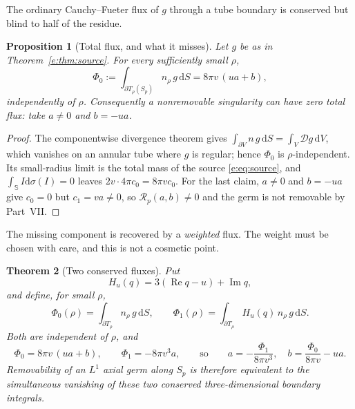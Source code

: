\documentclass[11pt,a4paper]{article}
\numberwithin{equation}{section}
\newtheorem{theorem}{Theorem}[section]
\newtheorem{proposition}[theorem]{Proposition}
\theoremstyle{definition}
\theoremstyle{remark}
\theoremstyle{plain}
\newcommand{\SSS}{\mathbb S}
\DeclareMathOperator{\Rea}{Re}
\DeclareMathOperator{\Ima}{Im}
\newcommand{\Dop}{\mathcal D}
\newcommand{\Sp}{S_{p}}
\newcommand{\Rp}{\mathcal R_{p}}      %
\newcommand{\Tube}{T}
\newcommand{\dd}{\mathrm d}
\begin{document}
The ordinary Cauchy--Fueter flux of $g$ through a tube boundary is
conserved but blind to half of the residue.

\begin{proposition}[Total flux, and what it misses]
\label{e:prop:flux0}
Let $g$ be as in Theorem~\ref{e:thm:source}. For every sufficiently small
$\rho$,
\begin{equation}
 \Phi_0:=\int_{\partial\Tube_\rho(\Sp)}n_\rho\,g\,\dd S
       =8\pi v\,(ua+b),
 \label{e:eq:flux0}
\end{equation}
independently of $\rho$. Consequently a nonremovable singularity can have
zero total flux: take $a\ne0$ and $b=-ua$.
\end{proposition}

\begin{proof}
The componentwise divergence theorem gives
$\int_{\partial V}n\,g\,\dd S=\int_V\Dop g\,\dd V$, which vanishes on an
annular tube where $g$ is regular; hence $\Phi_0$ is
$\rho$-independent. Its small-radius limit is the total mass of the
source \eqref{e:eq:source}, and $\int_{\SSS}I\dd\sigma(I)=0$ leaves
$2v\cdot4\pi c_0=8\pi vc_0$. For the last claim, $a\ne0$ and $b=-ua$ give
$c_0=0$ but $c_1=va\ne0$, so $\Rp(a,b)\ne0$ and the germ is not
removable by Part~VII.
\end{proof}

The missing component is recovered by a \emph{weighted} flux. The weight
must be chosen with care, and this is not a cosmetic point.

\begin{theorem}[Two conserved fluxes]
\label{e:thm:twoflux}
Put
\begin{equation}
 H_u(q)=3(\Rea q-u)+\Ima q,
 \label{e:eq:Hu}
\end{equation}
and define, for small $\rho$,
\begin{equation}
 \Phi_0(\rho)=\int_{\partial\Tube_\rho}n_\rho\,g\,\dd S,
 \qquad
 \Phi_1(\rho)=\int_{\partial\Tube_\rho}H_u(q)\,n_\rho\,g\,\dd S.
 \label{e:eq:twoflux}
\end{equation}
Both are independent of $\rho$, and
\begin{equation}
 \Phi_0=8\pi v\,(ua+b),
 \qquad
 \Phi_1=-8\pi v^3a,
 \qquad\text{so}\qquad
 a=-\frac{\Phi_1}{8\pi v^3},
 \quad
 b=\frac{\Phi_0}{8\pi v}-ua.
 \label{e:eq:recover-flux}
\end{equation}
Removability of an $L^1$ axial germ along $\Sp$ is therefore equivalent
to the simultaneous vanishing of these two conserved three-dimensional
boundary integrals.
\end{theorem}
\end{document}
